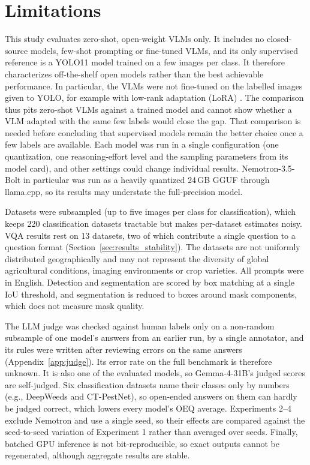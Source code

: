 \documentclass[10pt,letterpaper]{article}
\newcommand{\newtext}[1]{#1}
\begin{document}
\section{Limitations}
\label{sec:limitations}
This study evaluates zero-shot, open-weight VLMs only. It includes no closed-source models, few-shot prompting or fine-tuned VLMs, and its only supervised reference is a YOLO11 model trained on a few images per class. It therefore characterizes off-the-shelf open models rather than the best achievable performance. In particular, the VLMs were not fine-tuned on the labelled images given to YOLO, for example with low-rank adaptation (LoRA) \cite{hu_lora_2022}. The comparison thus pits zero-shot VLMs against a trained model and cannot show whether a VLM adapted with the same few labels would close the gap. That comparison is needed before concluding that supervised models remain the better choice once a few labels are available. Each model was run in a single configuration (one quantization, one reasoning-effort level and the sampling parameters from its model card), and other settings could change individual results. Nemotron-3.5-Bolt in particular was run as a heavily quantized 24\,GB GGUF through llama.cpp, so its results may understate the full-precision model.

Datasets were subsampled (up to five images per class for classification), which keeps 220 classification datasets tractable but makes per-dataset estimates noisy. VQA results rest on 13 datasets, two of which contribute a single question to a question format (Section~\ref{sec:results_stability}). The datasets are not uniformly distributed geographically and may not represent the diversity of global agricultural conditions, imaging environments or crop varieties. All prompts were in English. Detection and segmentation are scored by box matching at a single IoU threshold, and segmentation is reduced to boxes around mask components, which does not measure mask quality.

\newtext{The LLM judge was checked against human labels only on a non-random subsample of one model's answers from an earlier run, by a single annotator, and its rules were written after reviewing errors on the same answers (Appendix~\ref{app:judge}). Its error rate on the full benchmark is therefore unknown.} It is also one of the evaluated models, so Gemma-4-31B's judged scores are self-judged. Six classification datasets name their classes only by numbers (e.g., DeepWeeds and CT-PestNet), so open-ended answers on them can hardly be judged correct, which lowers every model's OEQ average. Experiments 2--4 exclude Nemotron and use a single seed, so their effects are compared against the seed-to-seed variation of Experiment 1 rather than averaged over seeds. Finally, batched GPU inference is not bit-reproducible, so exact outputs cannot be regenerated, although aggregate results are stable.
\end{document}

